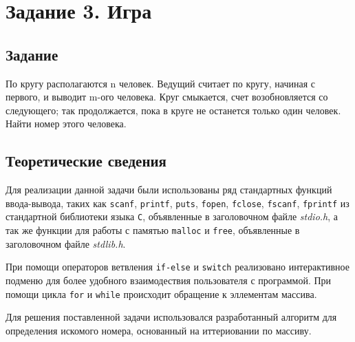\documentclass[12pt,a4paper]{report}
\begin{document}
\section{Задание 3. Игра}
\subsection{Задание}

\hspace{\parindent}По кругу располагаются n человек. Ведущий считает по кругу, начиная с первого, и выводит m-ого человека. Круг смыкается, счет возобновляется со следующего; так  продолжается, пока в круге не останется только один человек. Найти номер этого человека.

\subsection{Теоретические сведения}
\hspace{\parindent}Для реализации данной задачи были использованы ряд стандартных функций ввода-вывода, таких как \texttt{scanf}, \texttt{printf}, \texttt{puts}, \texttt{fopen}, \texttt{fclose}, \texttt{fscanf}, \texttt{fprintf} из стандартной библиотеки языка \verb+С+, объявленные в заголовочном файле \textit{stdio.h}, а так же функции для работы с памятью \verb+malloc+ и \verb+free+, объявленные в заголовочном файле \textit{stdlib.h}.

При помощи операторов ветвления \texttt{if-else} и \texttt{switch} реализовано интерактивное подменю для более удобного взаимодествия пользователя с программой. При помощи цикла \verb+for+ и \verb+while+ происходит обращение к эллементам массива.

Для решения поставленной задачи использовался разработанный алгоритм для определения искомого номера, основанный на иттериовании по массиву.
\end{document}
